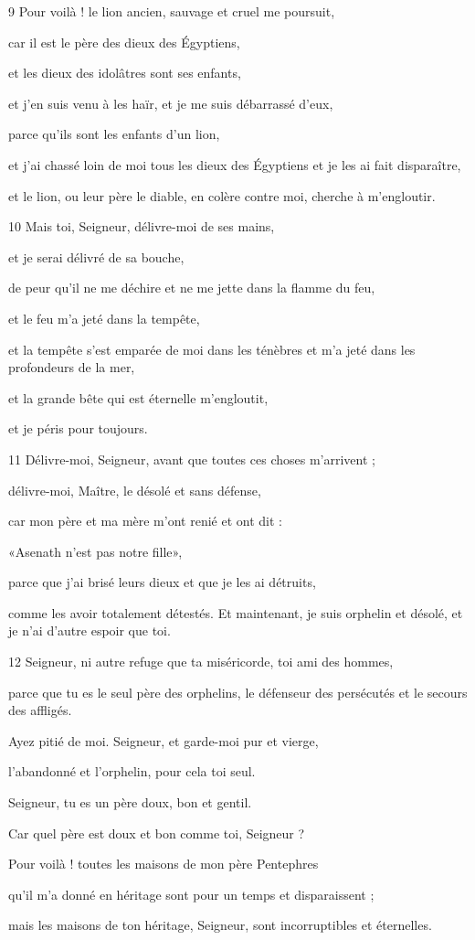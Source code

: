\par 9 Pour voilà ! le lion ancien, sauvage et cruel me poursuit,
\par car il est le père des dieux des Égyptiens,
\par et les dieux des idolâtres sont ses enfants,
\par et j'en suis venu à les haïr, et je me suis débarrassé d'eux,
\par parce qu'ils sont les enfants d'un lion,
\par et j'ai chassé loin de moi tous les dieux des Égyptiens et je les ai fait disparaître,
\par et le lion, ou leur père le diable, en colère contre moi, cherche à m'engloutir.

\par 10 Mais toi, Seigneur, délivre-moi de ses mains,
\par et je serai délivré de sa bouche,
\par de peur qu'il ne me déchire et ne me jette dans la flamme du feu,
\par et le feu m'a jeté dans la tempête,
\par et la tempête s'est emparée de moi dans les ténèbres et m'a jeté dans les profondeurs de la mer,
\par et la grande bête qui est éternelle m'engloutit,
\par et je péris pour toujours.

\par 11 Délivre-moi, Seigneur, avant que toutes ces choses m'arrivent ;
\par délivre-moi, Maître, le désolé et sans défense,
\par car mon père et ma mère m'ont renié et ont dit :
\par «Asenath n'est pas notre fille»,
\par parce que j'ai brisé leurs dieux et que je les ai détruits,
\par comme les avoir totalement détestés. Et maintenant, je suis orphelin et désolé, et je n'ai d'autre espoir que toi.

\par 12 Seigneur, ni autre refuge que ta miséricorde, toi ami des hommes,
\par parce que tu es le seul père des orphelins, le défenseur des persécutés et le secours des affligés.
\par Ayez pitié de moi. Seigneur, et garde-moi pur et vierge,
\par l'abandonné et l'orphelin, pour cela toi seul.
\par Seigneur, tu es un père doux, bon et gentil.
\par Car quel père est doux et bon comme toi, Seigneur ?
\par Pour voilà ! toutes les maisons de mon père Pentephres
\par qu'il m'a donné en héritage sont pour un temps et disparaissent ;
\par mais les maisons de ton héritage, Seigneur, sont incorruptibles et éternelles.

